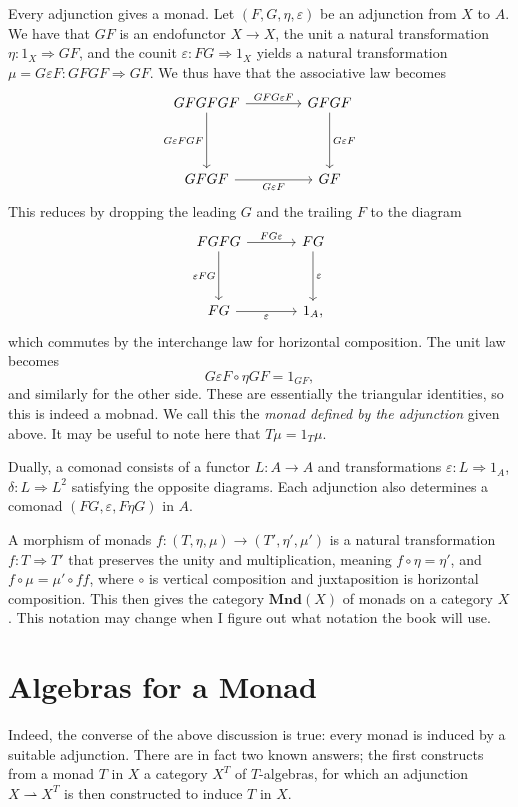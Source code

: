 Every adjunction gives a monad. Let $(F,G,\eta,\varepsilon )$ be an adjunction from $X$ to $A$. We have that $GF$ is an endofunctor $X\to X$, the unit a natural transformation $\eta : 1_X \Rightarrow GF$, and the counit $\varepsilon : FG \Rightarrow 1_X$ yields a natural transformation $\mu = G\varepsilon F : GFGF \Rightarrow GF$. We thus have that the associative law becomes
\[\begin{tikzcd}[row sep = 4em, column sep = 4em]
GFGFGF \ar[" GFG\varepsilon F ", r] \ar[" G\varepsilon FGF "', d]  & GFGF\ar[" G\varepsilon F ", d]  \\
GFGF\ar[" G\varepsilon F "', r]  & GF
\end{tikzcd}\]
This reduces by dropping the leading $G$ and the trailing $F$ to the diagram
\[\begin{tikzcd}[row sep = 3.5em, column sep = 3.5em]
FGFG \ar[" FG\varepsilon  ", r] \ar[" \varepsilon FG "', d]  & FG \ar[" \varepsilon  ", d]  \\
FG\ar[" \varepsilon  "', r]  & 1_A,
\end{tikzcd}\]
which commutes by the interchange law for horizontal composition. The unit law becomes
\[
	G\varepsilon F\circ \eta GF = 1_{GF} ,
\]
and similarly for the other side. These are essentially the triangular identities, so this is indeed a mobnad. We call this the \emph{monad defined by the adjunction} given above. It may be useful to note here that $T\mu = 1_T \mu$.

Dually, a comonad consists of a functor $L : A \to A$ and transformations $\varepsilon : L \Rightarrow 1_A$, $\delta : L \Rightarrow L^2$ satisfying the opposite diagrams. Each adjunction also determines a comonad $(FG,\varepsilon ,F\eta G)$ in $A$.

A morphism of monads $f : (T,\eta,\mu) \to (T',\eta',\mu')$ is a natural transformation $f : T \Rightarrow T'$ that preserves the unity and multiplication, meaning $f\circ\eta = \eta'$, and $f\circ \mu = \mu' \circ ff$, where $\circ $ is vertical composition and juxtaposition is horizontal composition. This then gives the category $\mathbf{Mnd} (X)$ of monads on a category $X$. This notation may change when I figure out what notation the book will use.\

\section{Algebras for a Monad}

Indeed, the converse of the above discussion is true: every monad is induced by a suitable adjunction. There are in fact two known answers; the first constructs from a monad $T$ in $X$ a category $X^T$ of $T$-algebras, for which an adjunction $X\rightharpoonup X^T$ is then constructed to induce $T$ in $X$.

